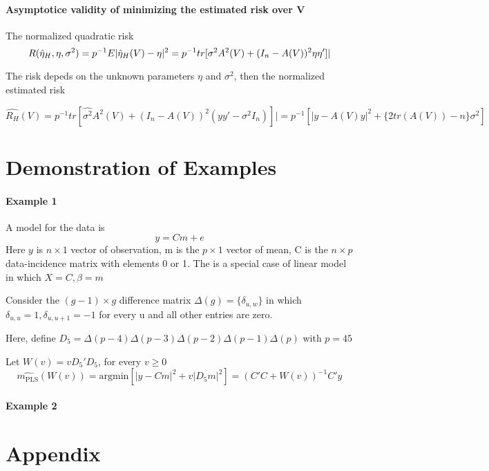 \documentclass[draft]{article}
\begin{document}
\paragraph{Asymptotice validity of minimizing the estimated risk over V} 
	
	The normalized quadratic risk
	$$
	R(\hat{\eta}_H, \eta, \sigma^2) = p^{-1}E|\hat{\eta}_H(V) - \eta|^2
			= p^{-1}tr[\sigma^2A^2(V) + (I_n - A(V))^2\eta\eta']|\\
	$$
	
	The risk depeds on the unknown parameters $\eta$ and $\sigma^2$, then the normalized estimated risk
	
	$$
	\hat{R_H}(V) = p^{-1}tr[\hat{\sigma^2}A^2(V) + (I_n - A(V))^2(yy' - \sigma^2I_n)]|
	= p^{-1}[|y - A(V)y|^2 + \{2tr(A(V)) - n\}\sigma^2]
	$$

\section{Demonstration of Examples}

\paragraph{Example 1}

A model for the data is 
$$
y = Cm + e
$$
Here $y$ is $n \times 1$ vector of observation, m is the $p \times 1$ vector of mean, C is the $n \times p$ data-incidence matrix with elements 0 or 1. The is a special case of linear model in which $X = C, \beta = m$

Consider the $(g-1)\times g$ difference matrix $\Delta(g) = \{\delta_{u,w}\}$ in which $\delta_{u,u} = 1, \delta_{u,u+1} = -1$ for every u and all other entries are zero. 

Here, define $D_5 = \Delta(p-4)\Delta(p-3)\Delta(p-2)\Delta(p-1)\Delta(p)$ with $p = 45$

Let $W(v) = vD_5'D_5$, for every $v \geq 0 $ 
$$
\hat{m_\text{PLS}}(W(v)) = \text{argmin}[|y-Cm|^2 + v|D_5m|^2] 
= (C'C + W(v))^{-1}C'y
$$
\paragraph{Example 2}




\section{Appendix}



 
\end{document}
